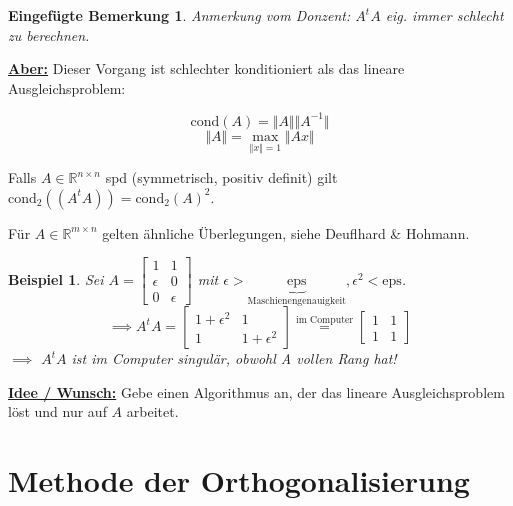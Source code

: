 \documentclass{book}
\newtheorem*{mremark}{Eingefügte Bemerkung}
\newtheorem{example}[algorithm]{Beispiel}
\def\R{\mathbb{R}}
\def\cond{\text{cond}}
\def\eps{\text{eps}}
\begin{document}
        \begin{mremark}
            Anmerkung vom Donzent: $A^tA$ eig. immer schlecht zu berechnen.
        \end{mremark}


        \underline{\textbf{Aber:}} Dieser Vorgang ist schlechter konditioniert als das lineare Ausgleichsproblem: 
        
        \begin{tcolorbox}[enhanced,breakable,
            title=Eingeschobene Definition / Wiederholung]
            \[
                \cond(A)=\Vert A \Vert \Vert A^{-1} \Vert
            \]
            \[
                \Vert A \Vert =\max_{\Vert x \Vert=1} \Vert Ax \Vert
            \]
        \end{tcolorbox}

        Falls $A\in\R^{n\times n}$ spd (symmetrisch, positiv definit) gilt $\cond_2((A^tA))=\cond_2(A)^2$. 

        Für $A\in\R^{m\times n}$ gelten ähnliche Überlegungen, siehe Deuflhard \& Hohmann.

        \begin{example}\label{b2.7}
            Sei $A=\begin{bmatrix}
                1 & 1\\\epsilon&0\\0 & \epsilon
            \end{bmatrix}$ mit $\epsilon>\underbrace{\eps}_{\text{Maschienengenauigkeit}},\epsilon^2<\eps$.
            \[\implies A^tA=\begin{bmatrix}
                1 +\epsilon^2 & 1\\
                1 & 1+\epsilon^2
            \end{bmatrix}\stackrel{\text{im Computer}}{=}\begin{bmatrix}
                1 & 1\\
                1 & 1
            \end{bmatrix}\]
            $\implies$ $A^tA$ ist im Computer singulär, obwohl A vollen Rang hat!
        \end{example}

        \underline{\textbf{Idee / Wunsch:}} Gebe einen Algorithmus an, der das lineare Ausgleichsproblem löst und nur 
        auf $A$ arbeitet.

        \section{Methode der Orthogonalisierung}
\end{document}

